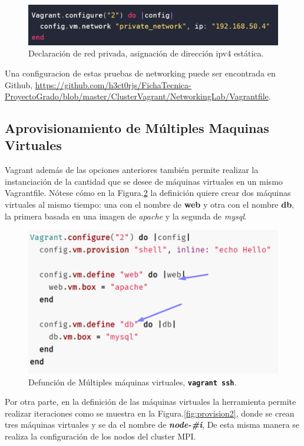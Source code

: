 \documentclass[letterpaper, 12pt, oneside]{article}
\begin{document}
    \begin{figure}[H]
        \includegraphics[scale=1.1]{img/vagrantport/privadastatic.png}
        \caption{Declaración de red privada, asignación de dirección ipv4 estática.}
        \label{fig:forward2}
    \end{figure}
    
    Una configuracion de estas pruebas de networking puede ser encontrada en Github, \url{https://github.com/h3ct0rjs/FichaTecnica-ProyectoGrado/blob/master/ClusterVagrant/NetworkingLab/Vagrantfile}.
    \subsection{Aprovisionamiento de Múltiples Maquinas Virtuales}
    Vagrant además de las opciones anteriores también permite realizar la instanciación de la cantidad que se desee de máquinas virtuales en un mismo Vagrantfile. Nótese cómo en la Figura.\ref{fig:provision1} la definición quiere crear dos máquinas virtuales al mismo tiempo: una con el nombre de \textbf{web} y otra con el nombre \textbf{db}, la primera basada en una imagen de \textit{apache} y la segunda de \textit{mysql}.
    \begin{figure}[H]
        \includegraphics[scale=0.9]{img/cluster/multi1.png}
        \caption{Defunción de Múltiples máquinas virtuales, \textbf{\texttt{vagrant ssh}}.}
        \label{fig:provision1}
    \end{figure}
    
    Por otra parte, en la definición de las máquinas virtuales la herramienta permite realizar iteraciones como se muestra en la Figura.\ref{fig:provision2}, donde se crean tres máquinas virtuales y se da el nombre de \textbf{\textit{node-\#i}}, De esta misma manera se realiza la configuración de los nodos del cluster MPI.
    
\end{document}
